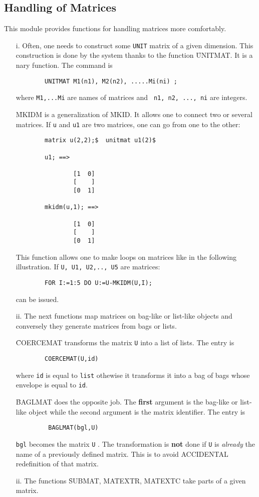 \subsection{Handling of Matrices}
This module provides functions for handling matrices more comfortably.
\begin{itemize}
\item[i.]
Often, one needs to construct some {\tt UNIT} matrix of
a given dimension. This construction is done by the system thanks
to the function \f{UNITMAT}. It is a nary function. The command is
\begin{verbatim}
        UNITMAT M1(n1), M2(n2), .....Mi(ni) ;
\end{verbatim}
where \verb+M1,...Mi+ are names of matrices and
\verb+ n1, n2, ..., ni+ are integers.

\f{MKIDM} is a generalization of \f{MKID}. It allows one to connect
two or several matrices. If \verb+u+ and \verb+u1+ are two matrices,
one can go from one to the other:
\begin{verbatim}
        matrix u(2,2);$  unitmat u1(2)$

        u1; ==>

                [1  0]
                [    ]
                [0  1]

        mkidm(u,1); ==>

                [1  0]
                [    ]
                [0  1]
\end{verbatim}
This function allows one to make loops on matrices like in the following
illustration. If \verb+U, U1, U2,.., U5+ are matrices:
\begin{verbatim}
        FOR I:=1:5 DO U:=U-MKIDM(U,I);
\end{verbatim}
can be issued.
\item[ii.]
The next functions map matrices on bag-like or list-like objects
and conversely  they generate matrices from bags or lists.

\f{COERCEMAT} transforms the matrix \verb+U+ into a list of lists.
The entry is
\begin{verbatim}
        COERCEMAT(U,id)
\end{verbatim}
where \verb+id+ is equal to \verb+list+ othewise it transforms it into
a bag of bags whose envelope is equal to \verb+id+.

\f{BAGLMAT} does the opposite job. The {\bf first} argument is the
bag-like or list-like object while the second argument is the matrix
identifier. The entry is
\begin{verbatim}
         BAGLMAT(bgl,U)
\end{verbatim}
\verb+bgl+ becomes the matrix \verb+U+ . The transformation is
{\bf not} done if \verb+U+  is {\em already} the  name of a
previously  defined matrix. This is to avoid ACCIDENTAL redefinition
of that matrix.
\item[ii.]
The functions \f{SUBMAT, MATEXTR, MATEXTC} take parts of a given matrix.


\end{itemize}
